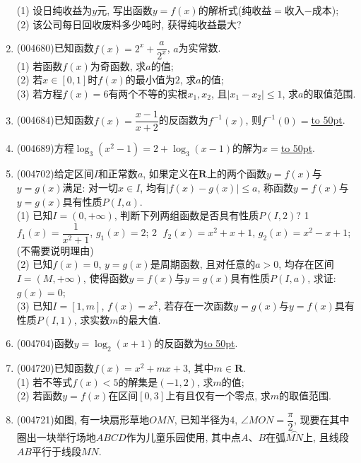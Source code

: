 \documentclass[10pt,a4paper]{article}
\newcommand{\blank}[1]{\underline{\hbox to #1pt{}}}
\begin{document}
\begin{enumerate}[1.]
(1) 设日纯收益为$y$元, 写出函数$y=f(x)$的解析式(纯收益$=$收入$-$成本);\\
(2) 该公司每日回收废料多少吨时, 获得纯收益最大?
\item {\tiny (004680)}已知函数$f(x)=2^x+\dfrac a{2^x}$, $a$为实常数.\\
(1) 若函数$f(x)$为奇函数, 求$a$的值;\\
(2) 若$x\in [0,1]$时$f(x)$的最小值为$2$, 求$a$的值;\\
(3) 若方程$f(x)=6$有两个不等的实根$x_1,x_2$, 且$|x_1-x_2|\le 1$, 求$a$的取值范围.
\item {\tiny (004684)}已知函数$f(x)=\dfrac{x-1}{x+2}$的反函数为$f^{-1}(x)$, 则$f^{-1}(0)=$\blank{50}.
\item {\tiny (004689)}方程$\log_3(x^2-1)=2+\log_3(x-1)$的解为$x=$\blank{50}.
\item {\tiny (004702)}给定区间$I$和正常数$a$, 如果定义在$\mathbf{R}$上的两个函数$y=f(x)$与$y=g(x)$满足: 对一切$x\in I$, 均有$|f(x)-g(x)|\le a$, 称函数$y=f(x)$与$y=g(x)$具有性质$P(I,a)$.\\
(1)	已知$I=(0,+\infty)$, 判断下列两组函数是否具有性质$P(I,2)$? \textcircled{1} $f_1(x)=\dfrac 1{{x^2}+1}$, $g_1(x)=2$; \textcircled{2} $f_2(x)=x^2+x+1$, $g_2(x)=x^2-x+1$;(不需要说明理由)\\
(2)	已知$f(x)=0$, $y=g(x)$是周期函数, 且对任意的$a>0$, 均存在区间$I=(M,+\infty)$, 使得函数$y=f(x)$与$y=g(x)$具有性质$P(I,a)$, 求证: $g(x)=0$;\\
(3)	已知$I=[1,m]$, $f(x)=x^2$, 若存在一次函数$y=g(x)$与$y=f(x)$具有性质$P(I,1)$, 求实数$m$的最大值.
\item {\tiny (004704)}函数$y=\log_2(x+1)$的反函数为\blank{50}.
\item {\tiny (004720)}已知函数$f(x)=x^2+mx+3$, 其中$m\in \mathbf{R}$.\\
(1) 若不等式$f(x)<5$的解集是$(-1,2)$, 求$m$的值;\\
(2) 若函数$y=f(x)$在区间$[0,3]$上有且仅有一个零点, 求$m$的取值范围.
\item {\tiny (004721)}如图, 有一块扇形草地$OMN$, 已知半径为$4$, $\angle MON=\dfrac\pi 2$, 现要在其中圈出一块举行场地$ABCD$作为儿童乐园使用, 其中点$A$、$B$在弧$\overset\frown{MN}$上, 且线段$AB$平行于线段$MN$.
\begin{center}
\end{center}
\end{enumerate}
\end{document}
